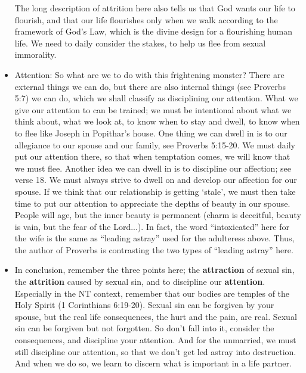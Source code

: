 \begin{itemize}
{  The long description of attrition here also tells us that God wants our
  life to flourish, and that our life flourishes only when we walk according
  to the framework of God's Law, which is the divine design for a flourishing
  human life. We need to daily consider the stakes, to help us flee from sexual immorality.}
  \item{Attention: So what are we to do with this frightening monster?  There
  are external things we can do, but there are also internal things (see
  Proverbs 5:7) we can do, which we shall classify as disciplining our
  attention.  What we give our attention to can be trained; we must be
  intentional about what we think about, what we look at, to know when to
  stay and dwell, to know when to flee like Joseph in Popithar's house.  One
  thing we can dwell in is to our allegiance to our spouse and our family,
  see Proverbs 5:15-20.  We must daily put our attention there, so that when
  temptation comes, we will know that we must flee.  Another idea we can
  dwell in is to discipline our affection; see verse 18.  We must always
  strive to dwell on and develop our affection for our spouse.  If we think
  that our relationship is getting `stale', we must then take time to put our
  attention to appreciate the depths of beauty in our spouse.  People will
  age, but the inner beauty is permanent (charm is deceitful, beauty is vain,
  but the fear of the Lord...).  In fact, the word ``intoxicated'' here for
  the wife is the same as ``leading astray'' used for the adulteress above.
  Thus, the author of Proverbs is contrasting the two types of ``leading
  astray'' here.}
  \item{In conclusion, remember the three points here; the
  \textbf{attraction} of sexual sin, the \textbf{attrition} caused by sexual
  sin, and to discipline our \textbf{attention}.  Especially in the NT
  context, remember that our bodies are temples of the Holy Spirit (1
  Corinthians 6:19-20).  Sexual sin can be forgiven by your spouse, but the
  real life consequences, the hurt and the pain, are real.  Sexual sin can be
  forgiven but not forgotten.  So don't fall into it, consider the
  consequences, and discipline your attention.  And for the unmarried, we
  must still discipline our attention, so that we don't get led astray into
  destruction.  And when we do so, we learn to discern what is important in a
  life partner.}
\end{itemize}